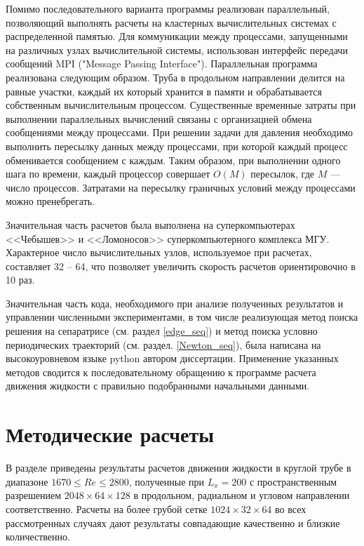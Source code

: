 Помимо последовательного варианта программы реализован параллельный, позволяющий выполнять расчеты на кластерных вычислительных системах с распределенной памятью. Для коммуникации между процессами, запущенными на различных узлах вычислительной системы, использован интерфейс передачи сообщений MPI ("Message Passing Interface"). Параллельная программа реализована следующим образом. Труба в продольном направлении делится на равные участки, каждый их который хранится в памяти и обрабатывается собственным вычислительным процессом. Существенные временные затраты при выполнении параллельных вычислений связаны с организацией обмена сообщениями между процессами. При решении задачи для давления необходимо выполнить пересылку данных между процессами, при которой каждый процесс обменивается сообщением с каждым. Таким образом, при выполнении одного шага по времени, каждый процессор совершает $O(M)$ пересылок, где $M$ --- число процессов. Затратами на пересылку граничных условий между процессами можно пренебрегать.

Значительная часть расчетов была выполнена на суперкомпьютерах <<Чебышев>> и <<Ломоносов>> суперкомпьютерного комплекса МГУ. Характерное число вычислительных узлов, используемое при расчетах, составляет 32 -- 64, что позволяет увеличить скорость расчетов ориентировочно в 10 раз. 

Значительная часть кода, необходимого при анализе полученных результатов и управлении численными экспериментами, в том числе реализующая метод поиска решения на сепаратрисе (см. раздел \ref{edge_seq}) и метод поиска условно периодических траекторий (см. раздел. \ref{Newton_seq}), была написана на высокоуровневом языке python автором диссертации. Применение указанных методов сводится к последовательному обращению к программе расчета движения жидкости с правильно подобранными начальными данными. 


\section{Методические расчеты} \label{puff_calc}

В разделе приведены результаты расчетов движения жидкости в круглой трубе в диапазоне $1670\leqslant Re\leqslant 2800$, полученные при $L_x=200$ с пространственным разрешением $2048 \times 64 \times 128$ в продольном, радиальном и угловом направлении соответственно. Расчеты на более грубой сетке $1024\times32\times64$ во всех рассмотренных случаях дают результаты совпадающие качественно и близкие количественно.

